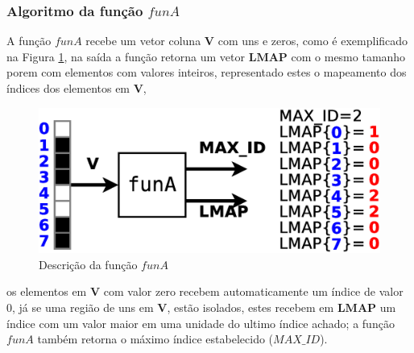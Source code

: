 \documentclass[a4paper,10pt]{article}
\begin{document}
\subsubsection{Algoritmo da função $funA$}
\label{subsubsec:funA}
A função $funA$ recebe um vetor coluna $\mathbf{V}$ com uns e zeros, como é exemplificado na
Figura \ref{fig:funA}, na saída a função retorna um vetor $\mathbf{LMAP}$ com o mesmo tamanho
porem com elementos com valores inteiros, representado estes o mapeamento dos índices dos elementos em $\mathbf{V}$,
\begin{figure}[!htb]
\centering
\includegraphics[scale=0.33]{funA.eps}
\caption{Descrição da função $funA$ }
\label{fig:funA}
\end{figure}
os elementos em $\mathbf{V}$ com valor zero recebem automaticamente um índice de valor $0$,
já se uma região de uns em $\mathbf{V}$, estão isolados, estes recebem em $\mathbf{LMAP}$ um índice
com um valor maior em uma unidade do ultimo índice achado; a função $funA$ também retorna
 o máximo índice estabelecido ($MAX\_ID$).
\end{document}
